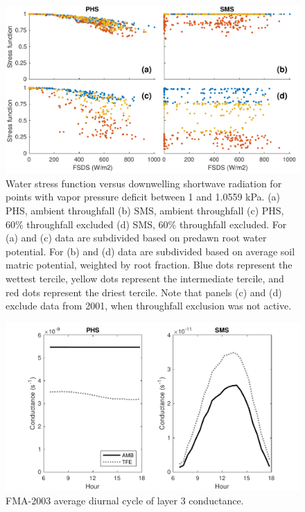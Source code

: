 \documentclass[draft,linenumbers]{agujournal}
\begin{document}
      \begin{figure}[h]
     \centering
     \includegraphics[width=30pc]{../figs2/suppfsds.pdf}
     \caption{Water stress function versus downwelling shortwave radiation for points with vapor pressure deficit between 1 and 1.0559 kPa.
     (a) PHS, ambient throughfall
     (b) SMS, ambient throughfall
     (c) PHS, 60\% throughfall excluded
     (d) SMS, 60\% throughfall excluded. 
     For (a) and (c) data are subdivided based on predawn root water potential.
     For (b) and (d) data are subdivided based on average soil matric potential, weighted by root fraction.
     Blue dots represent the wettest tercile, yellow dots represent the intermediate tercile, and red dots represent the driest tercile.
     Note that panels (c) and (d) exclude data from 2001, when throughfall exclusion was not active.
     }
     \label{supp:fsds}
       \end{figure}
  
        \begin{figure}[h]
     \centering
     \includegraphics[width=30pc]{../figs2/suppfig1.pdf}
     \caption{FMA-2003 average diurnal cycle of layer 3 conductance.}
     \label{supp:cond}
  \end{figure}
  \clearpage
  
\end{document}
